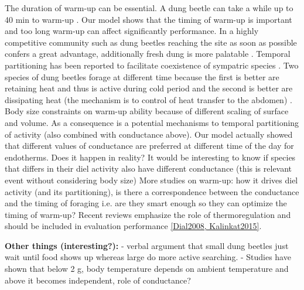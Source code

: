 The duration of warm-up can be essential.
A dung beetle can take a while up to 40 min to warm-up \citep{Verdu2008}.
Our  model shows that the timing of warm-up is important and too long warm-up can affect significantly performance.
In a highly competitive community such as dung beetles reaching the site as soon as possible confers a great advantage, additionally fresh dung is more palatable \citep{Hanski1991}.
Temporal partitioning has been reported to facilitate coexistence of sympatric species \citep{Verdu2007, Verdu2012}.
Two species of dung beetles forage at different time because the first is better are retaining heat and thus is active during cold period and the second is better are dissipating heat (the mechanism is to control of heat transfer to the abdomen) \citep{Verdu2012}.
Body size constraints on warm-up ability because of different scaling of surface and volume.
As a consequence is a potential mechanisms to temporal partitioning of activity (also combined with conductance above).
Our model actually showed that different values of conductance are preferred at different time of the day for endotherms.
Does it happen in reality? %
It would be interesting to know if species that differs in their diel activity also have different conductance (this is relevant event without considering body size)  
More studies on warm-up: how it drives diel activity (and its partitioning), is there a correspondence between the conductance and the timing of foraging i.e. are they smart enough so they can optimize the timing of warm-up? 
Recent reviews emphasize the role of thermoregulation and should be included in evaluation performance \cref{Dial2008, Kalinkat2015}.


\textbf{Other things (interesting?):} 
- verbal argument that small dung beetles just wait until food shows up whereas  large do more active searching.
- Studies have shown that below 2 g, body temperature depends on ambient temperature and above it becomes independent, role of conductance? 

